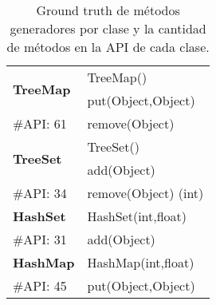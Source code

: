 \begin{table}[t!]
{\begin{tabular}{l l}
\multirow{2}{*}{\textbf{TreeMap}} 
 & TreeMap() \\
 & put(Object,Object) \\
{\scriptsize \#API: 61} & remove(Object) \\
\hline

\multirow{2}{*}{\textbf{TreeSet}} 
 & TreeSet() \\
 & add(Object) \\
{\scriptsize \#API: 34} & remove(Object) (int) \\
\hline

\multirow{1}{*}{\textbf{HashSet}} 
 & HashSet(int,float) \\
 {\scriptsize \#API: 31} & add(Object) \\
\hline

\multirow{1}{*}{\textbf{HashMap}} 
 & HashMap(int,float)  \\
{\scriptsize \#API: 45} & put(Object,Object)  \\
\hline

\end{tabular}%
}
\caption{Ground truth de métodos generadores por clase y la cantidad de métodos en la API de cada clase.}
\label{tab:groundTruth}
\end{table}
